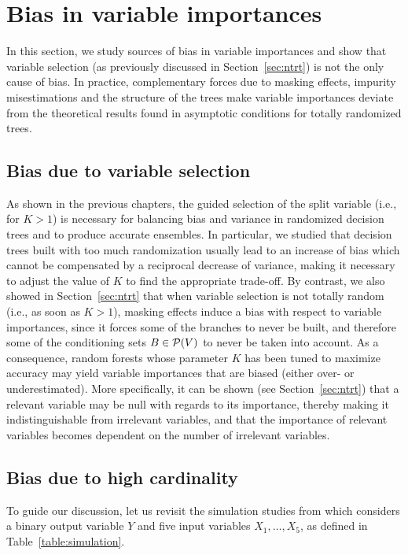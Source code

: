 \section{Bias in variable importances}
\label{sec:7:bias}

In this section, we study sources of bias in variable importances and show that
variable selection (as previously discussed in Section~\ref{sec:ntrt}) is  not
the only cause of bias. In practice, complementary forces due to masking
effects, impurity misestimations and the structure of the trees make variable
importances deviate from the theoretical results found in asymptotic conditions
for totally randomized trees.

\subsection{Bias due to variable selection}

As shown in the previous chapters, the guided selection of the split variable
(i.e., for $K>1$) is necessary for balancing bias and variance in  randomized
decision trees and to produce accurate ensembles. In particular, we studied
that decision trees built with too much randomization usually lead to an
increase of bias which cannot be compensated by a reciprocal decrease of
variance, making it necessary to adjust the value of $K$ to find the
appropriate trade-off. By contrast, we also showed in Section~\ref{sec:ntrt}
that when variable selection is not totally random (i.e., as soon as $K>1$),
masking effects induce a bias with respect to variable importances, since it
forces some of the branches to never be built, and therefore some of the
conditioning sets $B \in {\cal P}(V)$ to never be taken into account. As a
consequence, random forests whose parameter $K$ has been tuned to maximize
accuracy may yield variable importances that are biased (either
over- or underestimated). More specifically, it can be shown (see
Section~\ref{sec:ntrt}) that a relevant variable may be null with regards to
its importance, thereby making it indistinguishable from irrelevant variables,
and that the importance of relevant variables becomes dependent on the number
of irrelevant variables.

\subsection{Bias due to high cardinality}

To guide our discussion, let us revisit the simulation studies from
\citep{strobl:2007b} which considers a binary output variable $Y$ and five
input variables $X_1,\dots,X_5$, as defined in Table~\ref{table:simulation}.


